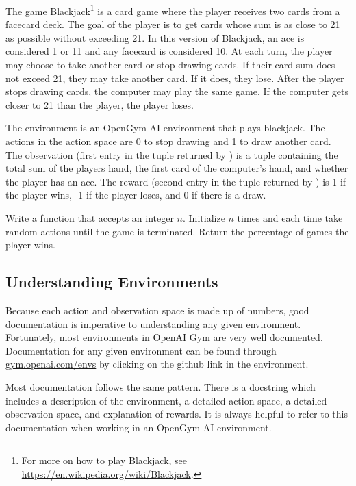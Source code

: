 \begin{problem}
The game Blackjack\footnote{For more on how to play Blackjack, see \url{https://en.wikipedia.org/wiki/Blackjack}.} is a card game where the player receives two cards from a facecard deck.
The goal of the player is to get cards whose sum is as close to 21 as possible without exceeding 21.
In this version of Blackjack, an ace is considered 1 or 11 and any facecard is considered 10.
At each turn, the player may choose to take another card or stop drawing cards.
If their card sum does not exceed 21, they may take another card.
If it does, they lose.
After the player stops drawing cards, the computer may play the same game.
If the computer gets closer to 21 than the player, the player loses.

The environment  is an OpenGym AI environment that plays blackjack.
The actions in the action space are 0 to stop drawing and 1 to draw another card.
The observation (first entry in the tuple returned by ) is a tuple containing the total sum of the players hand, the first card of the computer's hand, and whether the player has an ace.
The reward (second entry in the tuple returned by ) is 1 if the player wins, -1 if the player loses, and 0 if there is a draw.

Write a function  that accepts an integer $n$.
Initialize  $n$ times and each time take random actions until the game is terminated.
Return the percentage of games the player wins.

\label{prob:random-blackjack}
\end{problem}

\subsection*{Understanding Environments}

Because each action and observation space is made up of numbers, good documentation is imperative to understanding any given environment.
Fortunately, most environments in OpenAI Gym are very well documented.
Documentation for any given environment can be found through \url{gym.openai.com/envs} by clicking on the github link in the environment.

Most documentation follows the same pattern.
There is a docstring which includes a description of the environment, a detailed action space, a detailed observation space, and explanation of rewards.
It is always helpful to refer to this documentation when working in an OpenGym AI environment.

